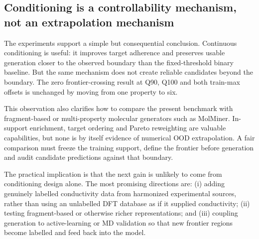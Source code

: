 \subsection*{Conditioning is a controllability mechanism, not an extrapolation mechanism}

The experiments support a simple but consequential conclusion. Continuous conditioning is useful: it improves target adherence and preserves usable generation closer to the observed boundary than the fixed-threshold binary baseline. But the same mechanism does not create reliable candidates beyond the boundary. The zero frontier-crossing result at Q90, Q100 and both train-max offsets is unchanged by moving from one property to six.

This observation also clarifies how to compare the present benchmark with fragment-based or multi-property molecular generators such as MolMiner. In-support enrichment, target ordering and Pareto reweighting are valuable capabilities, but none is by itself evidence of numerical OOD extrapolation. A fair comparison must freeze the training support, define the frontier before generation and audit candidate predictions against that boundary.

The practical implication is that the next gain is unlikely to come from conditioning design alone. The most promising directions are: (i) adding genuinely labelled conductivity data from harmonized experimental sources, rather than using an unlabelled DFT database as if it supplied conductivity; (ii) testing fragment-based or otherwise richer representations; and (iii) coupling generation to active-learning or MD validation so that new frontier regions become labelled and feed back into the model.

